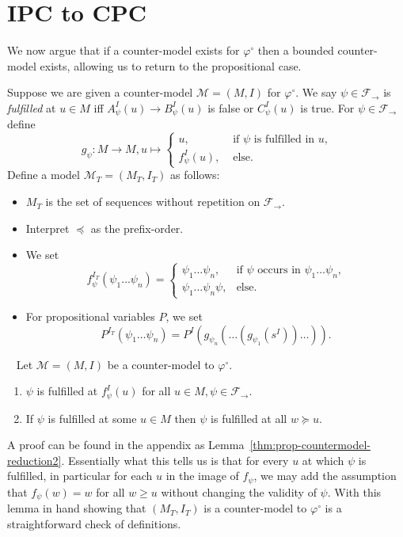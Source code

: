 \documentclass[runningheads]{llncs}
\begin{document}
\section{IPC to CPC}

We now argue that if a counter-model exists for $\varphi^\circ$ then a bounded counter-model exists, allowing us to return to the propositional case.

\begin{definition}
Suppose we are given a counter-model $\mathcal M = (M, I)$ for $\varphi^\circ$.
We say $\psi\in\mathcal F_\to$ is \emph{fulfilled} at $u\in M$ iff $A_\psi^I(u)\to B_\psi^I(u)$ is false or $C_\psi^I(u)$ is true. For $\psi\in\mathcal F_\to$ define $$g_\psi : M\to M, u\mapsto\begin{cases}
		u,&\text{ if $\psi$ is fulfilled in $u$,}\\
		f^I_\psi(u),&\text{ else.}		
	\end{cases}$$Define a model $\mathcal M_T = (M_T, I_T)$ as follows:
	\begin{itemize}
		\item $M_T$ is the set of sequences without repetition on $\mathcal F_\to$.
		\item Interpret $\preceq$ as the prefix-order.
		\item We set $$f_\psi^{I_T}(\psi_1\dots\psi_n) = \begin{cases}
			\psi_1\dots\psi_n, &\text{if $\psi$ occurs in $\psi_1\dots\psi_n$,}\\
			\psi_1\dots\psi_n\psi, &\text{else.}			
		\end{cases}$$
		\item For propositional variables $P$, we set $$P^{I_T}(\psi_1\dots \psi_n) = P^I(g_{\psi_n}(\dots(g_{\psi_1}(s^I))\dots)).$$
	\end{itemize}
\end{definition}
\begin{lemma}~\label{thm:prop-countermodel-reduction}
	Let $\mathcal M = (M, I)$ be a counter-model to $\mathcal \varphi^\circ$.
	\begin{enumerate}
		\item $\psi$ is fulfilled at $f_\psi^I(u)$ for all $u\in M, \psi\in\mathcal F_\to$.
		\item If $\psi$ is fulfilled at some $u\in M$ then $\psi$ is fulfilled at all $w\succeq u$.
	\end{enumerate}
\end{lemma}

A proof can be found in the appendix as Lemma~\ref{thm:prop-countermodel-reduction2}. Essentially what this tells us is that for every $u$ at which $\psi$ is fulfilled, in particular for each $u$ in the image of $f_\psi$, we may add the assumption that $f_\psi(w) = w$ for all $w\geq u$ without changing the validity of $\psi$.
With this lemma in hand showing that $(M_T, I_T)$ is a counter-model to $\varphi^\circ$ is a straightforward check of definitions.
\end{document}
